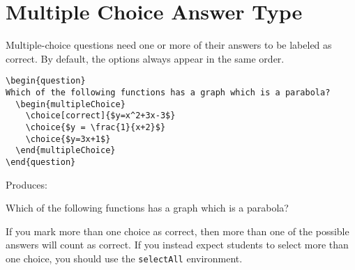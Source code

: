 \documentclass{ximera}
\begin{document}
\section{Multiple Choice Answer Type} \label{MCAnswerType}

\begin{example}
Multiple-choice questions need one or more of their answers to be labeled as correct. By default, the options always appear in the same order.

\begin{verbatim}
\begin{question}
Which of the following functions has a graph which is a parabola?
  \begin{multipleChoice}
    \choice[correct]{$y=x^2+3x-3$}
    \choice{$y = \frac{1}{x+2}$}
    \choice{$y=3x+1$}
  \end{multipleChoice}
\end{question}
\end{verbatim}

Produces:

\begin{question}
  Which of the following functions has a graph which is a parabola?
  \begin{multipleChoice}
  \end{multipleChoice}
\end{question}

\begin{remark}
If you mark more than one choice as correct, then more than one of the possible answers will count as correct. If you instead expect students to select more than one choice, you should use the \verb!selectAll! environment.
\end{remark}

\end{example}
\end{document}

